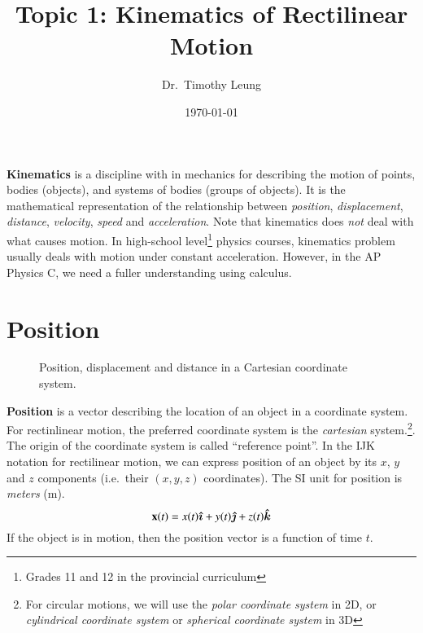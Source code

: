\documentclass{../../oss-handout}
\title{Topic 1: Kinematics of Rectilinear Motion}
\author{Dr.\ Timothy Leung}
\date{\today}
\newcommand{\mb}[1]{\ensuremath\mathbf{#1}}
\begin{document}
\thispagestyle{title}
\gentitle

\textbf{Kinematics} is a discipline with in mechanics for describing the
motion of points, bodies (objects), and systems of  bodies (groups of objects).
It is the mathematical representation of the relationship between
\emph{position}, \emph{displacement}, \emph{distance}, \emph{velocity},
\emph{speed} and \emph{acceleration}. Note that kinematics does \emph{not}
deal with what causes motion. In high-school level\footnote{Grades 11 and 12 in
  the provincial curriculum} physics courses, kinematics problem usually deals
with motion under constant acceleration. However, in the AP Physics C, we need
a fuller understanding using calculus.

\section{Position}

\begin{wrapfigure}{r}{.35\textwidth}
  \centering
  \vspace{-.1in}
  \caption{Position, displacement and distance in a Cartesian coordinate
    system.}
  \label{fig:d-vs-d}
\end{wrapfigure}
\textbf{Position} is a vector describing the location of an object in a
coordinate system. For rectinlinear motion, the preferred coordinate system
is the \emph{cartesian} system.\footnote{For circular motions, we will use
  the \emph{polar coordinate system} in 2D, or
  \emph{cylindrical coordinate system} or \emph{spherical coordinate system} in
  3D}. The origin of the coordinate system is called ``reference point''.  In
the IJK notation for rectilinear motion, we can express position of an object
by its $x$, $y$ and $z$ components (i.e.\ their $(x,y,z)$ coordinates). The SI
unit for position is \emph{meters} (\si{\metre}).
\begin{equation*}
  \mb{x}(t)=x(t)\bm{\hat{\imath}} + y(t)\bm{\hat{\jmath}} + z(t)\bm{\hat{k}}
\end{equation*}
If the object is in motion, then the position vector is a function of time $t$.
\end{document}
